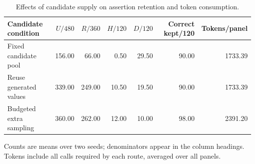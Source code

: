\begin{table}[t]
\centering
\small
\caption{Effects of candidate supply on assertion retention and token consumption.}
\label{tab:supply}
\begin{tabular}{lrrrrrr}
\toprule
Candidate condition & $U/480$ & $R/360$ & $H/120$ & $D/120$ & Correct kept/120 & Tokens/panel \\
\midrule
Fixed candidate pool & 156.00 & 66.00 & 0.50 & 29.50 & 90.00 & 1733.39 \\
Reuse generated values & 339.00 & 249.00 & 10.50 & 19.50 & 90.00 & 1733.39 \\
Budgeted extra sampling & 360.00 & 262.00 & 12.00 & 10.00 & 98.00 & 2391.20 \\
\bottomrule
\end{tabular}
\par\smallskip
\begin{minipage}{\linewidth}
\footnotesize
Counts are means over two seeds; denominators appear in the column headings. Tokens include all calls required by each route, averaged over all panels.
\end{minipage}
\end{table}

